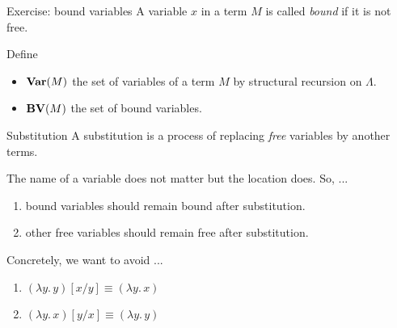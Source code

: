 \begin{frame}{Exercise: bound variables}
  A variable $x$ in a term $M$ is called \emph{bound} if it is not free.

  Define
  \begin{itemize}
    \item $\mathbf{Var}(M)$ the set of variables of a term $M$ by structural recursion on $\Lambda$.
    \item $\mathbf{BV}(M)$ the set of bound variables.
  \end{itemize}
\end{frame}

\begin{frame}{Substitution}
   A \alert{substitution} is a process of replacing \emph{free} variables by
   another terms. 

   The name of a variable does not matter but the location does. So, ...
   \begin{enumerate}
     \item bound variables should remain bound after substitution.
     \item other free variables should remain free after substitution.
   \end{enumerate}

   Concretely, we want to avoid ...
  \begin{enumerate}
    \item $(\lambda y.\,y)[x/y] \equiv (\lambda y.\, x)$
    \item $(\lambda y.\, x)[y/x] \equiv (\lambda y.\, y)$ 
  \end{enumerate}
   
  
\end{frame}
  
